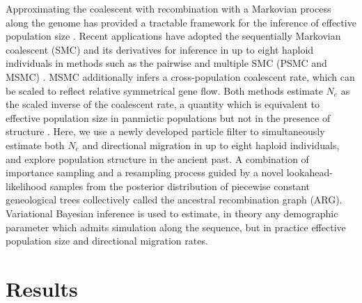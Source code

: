 \documentclass{article}
\begin{document}
Approximating the coalescent with recombination with a Markovian process along the genome has provided a tractable framework for the inference of effective population size \cite{McVean2005}. Recent applications have adopted the sequentially Markovian coalescent (SMC) and its derivatives for inference in up to eight haploid individuals in methods such as the pairwise and multiple SMC (PSMC and MSMC) \cite{Li2011, Schiffels2014}. MSMC additionally infers a cross-population coalescent rate, which can be scaled to reflect relative symmetrical gene flow. Both methods estimate $N_e$ as the scaled inverse of the coalescent rate, a quantity which is equivalent to effective population size in panmictic populations but not in the presence of structure \cite{Chikhi2018}. Here, we use a newly developed particle filter to simultaneously estimate both $N_e$ and directional migration in up to eight haploid individuals, and explore population structure in the ancient past. A combination of importance sampling and a resampling process guided by a novel lookahead-likelihood samples from the posterior distribution of piecewise constant geneological trees collectively called the ancestral recombination graph (ARG). Variational Bayesian inference is used to estimate, in theory any demographic parameter which admits simulation along the sequence, but in practice effective population size and directional migration rates.  

\section{Results}
\end{document}

